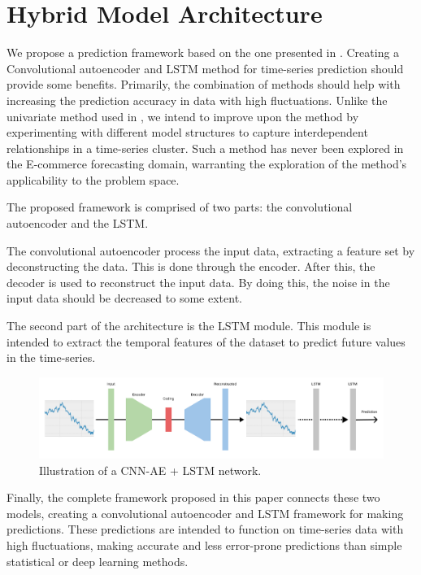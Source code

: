 \section{Hybrid Model Architecture}
\label{section:Architecture:Model}

We propose a prediction framework based on the one presented in \cite{Zhao2019}.
Creating a Convolutional autoencoder and LSTM method for time-series prediction should provide some benefits.
Primarily, the combination of methods should help with increasing the prediction accuracy in data with high fluctuations.
Unlike the univariate method used in \cite{Zhao2019},
we intend to improve upon the method by experimenting with different model structures to capture interdependent relationships in a time-series cluster.
Such a method has never been explored in the E-commerce forecasting domain, warranting the exploration of the method's applicability to the problem space.

The proposed framework is comprised of two parts: the convolutional autoencoder and the LSTM.

The convolutional autoencoder process the input data, extracting a feature set by deconstructing the data.
This is done through the encoder. After this, the decoder is used to reconstruct the input data.
By doing this, the noise in the input data should be decreased to some extent.

The second part of the architecture is the LSTM module.
This module is intended to extract the temporal features of the dataset
to predict future values in the time-series.

\begin{figure}[h!]
  \centering
  \includegraphics[width=\textwidth]{./figs/illustrations/CNN-AE + LSTM.png}
  \hfill
  \caption{Illustration of a CNN-AE + LSTM network.}
  \label{fig:cnn-ae+lstm-network}
\end{figure}

Finally, the complete framework proposed in this paper connects these two models,
creating a convolutional autoencoder and LSTM framework for making predictions.
These predictions are intended to function on time-series data with high fluctuations,
making accurate and less error-prone predictions than simple statistical or deep learning methods.


